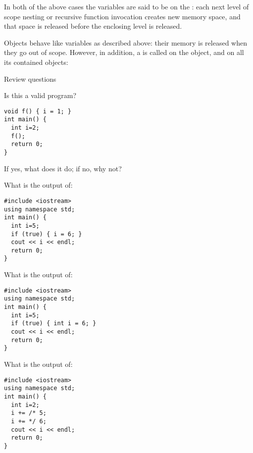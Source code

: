 In both of the above cases the variables are said to be on the
: each next level of scope nesting or recursive
function invocation creates new memory space, and that space is
released before the enclosing level is released.

Objects behave like variables as described above: their memory is
released when they go out of scope. However, in addition, a
 is called on the object, and on all its
contained objects:
%

 {Review questions}

\begin{exercise}
  \label{ex:cpp-scope1}
  Is this a valid program?
\begin{verbatim}
void f() { i = 1; }
int main() {
  int i=2;
  f();
  return 0;
}
\end{verbatim}
If yes, what does it do; if no, why not?
\end{exercise}

\begin{exercise}
  \label{ex:cpp-scope2}
  What is the output of:
\begin{verbatim}
#include <iostream>
using namespace std;
int main() {
  int i=5;
  if (true) { i = 6; }
  cout << i << endl;
  return 0;
}
\end{verbatim}
\end{exercise}

\begin{exercise}
  \label{ex:cpp-scope3}
  What is the output of:
\begin{verbatim}
#include <iostream>
using namespace std;
int main() {
  int i=5;
  if (true) { int i = 6; }
  cout << i << endl;
  return 0;
}
\end{verbatim}
\end{exercise}

\begin{exercise}
  \label{ex:cpp-scope4}
  What is the output of:
\begin{verbatim}
#include <iostream>
using namespace std;
int main() {
  int i=2;
  i += /* 5;
  i += */ 6;
  cout << i << endl;
  return 0;
}
\end{verbatim}
\end{exercise}

\endinput

Global variables, local variables.

When you defined a function for primality testing, you placed it
outside the main program, and the main program was able to use
it. There are other things than functions that can be defined outside
the main program, such as \indextermsub{global}{variables}.

Here is a program that uses a global variable:
\begin{verbatim}
int i=5;
int main() {
  i = i+3;
  cout << i << endl;
  return 0;
}
\end{verbatim}

